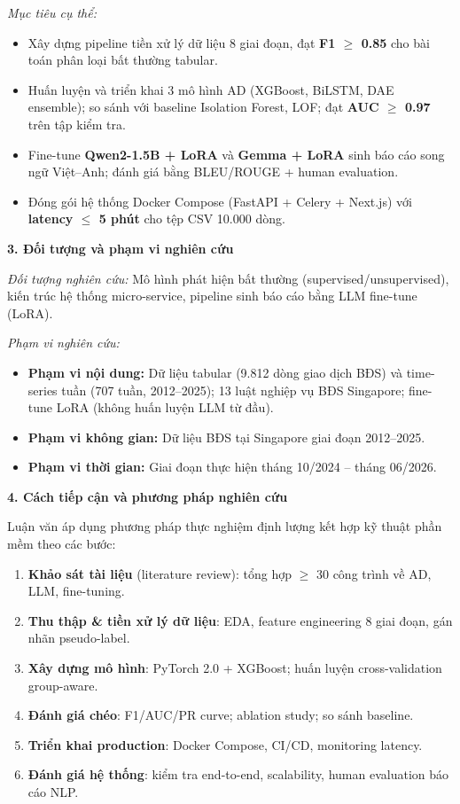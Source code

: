 \textit{Mục tiêu cụ thể:}
\begin{itemize}
  \item Xây dựng pipeline tiền xử lý dữ liệu 8 giai đoạn, đạt \textbf{F1 $\geq$ 0.85} cho bài toán phân loại bất thường tabular.
  \item Huấn luyện và triển khai 3 mô hình AD (XGBoost, BiLSTM, DAE ensemble); so sánh với baseline Isolation Forest, LOF; đạt \textbf{AUC $\geq$ 0.97} trên tập kiểm tra.
  \item Fine-tune \textbf{Qwen2-1.5B + LoRA} và \textbf{Gemma + LoRA} sinh báo cáo song ngữ Việt--Anh; đánh giá bằng BLEU/ROUGE + human evaluation.
  \item Đóng gói hệ thống Docker Compose (FastAPI + Celery + Next.js) với \textbf{latency $\leq$ 5 phút} cho tệp CSV 10.000 dòng.
\end{itemize}

\medskip
\noindent\textbf{3. Đối tượng và phạm vi nghiên cứu}

\textit{Đối tượng nghiên cứu:} Mô hình phát hiện bất thường (supervised/unsupervised), kiến trúc hệ thống micro-service, pipeline sinh báo cáo bằng LLM fine-tune (LoRA).

\textit{Phạm vi nghiên cứu:}
\begin{itemize}
  \item \textbf{Phạm vi nội dung:} Dữ liệu tabular (9.812 dòng giao dịch BĐS) và time-series tuần (707 tuần, 2012--2025); 13 luật nghiệp vụ BĐS Singapore; fine-tune LoRA (không huấn luyện LLM từ đầu).
  \item \textbf{Phạm vi không gian:} Dữ liệu BĐS tại Singapore giai đoạn 2012--2025.
  \item \textbf{Phạm vi thời gian:} Giai đoạn thực hiện tháng 10/2024 -- tháng 06/2026.
\end{itemize}

\medskip
\noindent\textbf{4. Cách tiếp cận và phương pháp nghiên cứu}

Luận văn áp dụng phương pháp thực nghiệm định lượng kết hợp kỹ thuật phần mềm theo các bước:
\begin{enumerate}
  \item \textbf{Khảo sát tài liệu} (literature review): tổng hợp $\geq$ 30 công trình về AD, LLM, fine-tuning.
  \item \textbf{Thu thập \& tiền xử lý dữ liệu}: EDA, feature engineering 8 giai đoạn, gán nhãn pseudo-label.
  \item \textbf{Xây dựng mô hình}: PyTorch 2.0 + XGBoost; huấn luyện cross-validation group-aware.
  \item \textbf{Đánh giá chéo}: F1/AUC/PR curve; ablation study; so sánh baseline.
  \item \textbf{Triển khai production}: Docker Compose, CI/CD, monitoring latency.
  \item \textbf{Đánh giá hệ thống}: kiểm tra end-to-end, scalability, human evaluation báo cáo NLP.
\end{enumerate}

